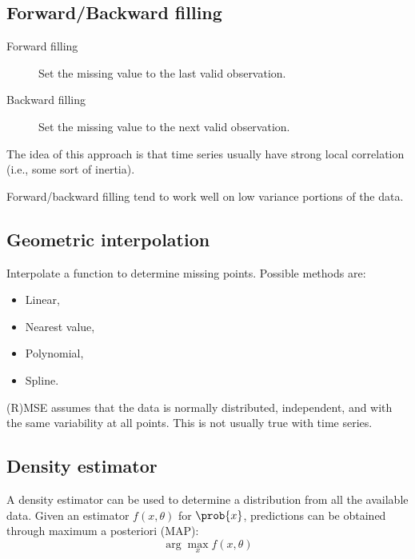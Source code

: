 \subsection{Forward/Backward filling}

\begin{description}
    \item[Forward filling] 
        Set the missing value to the last valid observation.

    \item[Backward filling] 
        Set the missing value to the next valid observation.
\end{description}

\begin{remark}
    The idea of this approach is that time series usually have strong local correlation (i.e., some sort of inertia).
\end{remark}

\begin{remark}
    Forward/backward filling tend to work well on low variance portions of the data.
\end{remark}


\subsection{Geometric interpolation}

Interpolate a function to determine missing points. Possible methods are:
\begin{itemize}
    \item Linear,
    \item Nearest value,
    \item Polynomial,
    \item Spline.
\end{itemize}

\begin{remark}
    (R)MSE assumes that the data is normally distributed, independent, and with the same variability at all points. This is not usually true with time series.
\end{remark}


\subsection{Density estimator}

A density estimator can be used to determine a distribution from all the available data. Given an estimator $f(x, \theta)$ for $\prob{x}$, predictions can be obtained through maximum a posteriori (MAP):
\[ \arg\max_{x} f(x, \theta) \]

